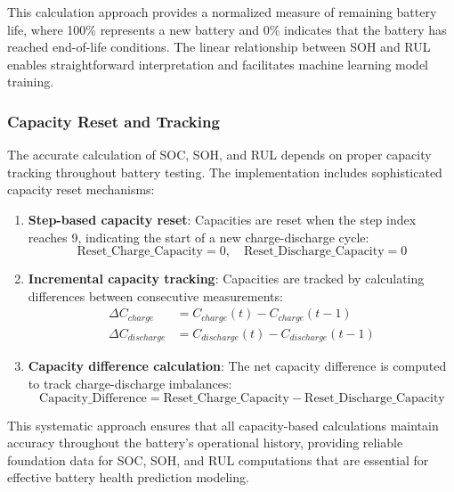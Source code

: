 This calculation approach provides a normalized measure of remaining battery life, where 100\% represents a new battery and 0\% indicates that the battery has reached end-of-life conditions. The linear relationship between SOH and RUL enables straightforward interpretation and facilitates machine learning model training.

\subsubsection{Capacity Reset and Tracking}
\label{subsubsec:capacity_tracking}

The accurate calculation of SOC, SOH, and RUL depends on proper capacity tracking throughout battery testing. The implementation includes sophisticated capacity reset mechanisms:

\begin{enumerate}
    \item \textbf{Step-based capacity reset}: Capacities are reset when the step index reaches 9, indicating the start of a new charge-discharge cycle:
    \begin{equation}
        \text{Reset\_Charge\_Capacity} = 0, \quad \text{Reset\_Discharge\_Capacity} = 0
    \end{equation}
    
    \item \textbf{Incremental capacity tracking}: Capacities are tracked by calculating differences between consecutive measurements:
    \begin{align}
        \Delta C_{charge} &= C_{charge}(t) - C_{charge}(t-1) \\
        \Delta C_{discharge} &= C_{discharge}(t) - C_{discharge}(t-1)
    \end{align}
    
    \item \textbf{Capacity difference calculation}: The net capacity difference is computed to track charge-discharge imbalances:
    \begin{equation}
        \text{Capacity\_Difference} = \text{Reset\_Charge\_Capacity} - \text{Reset\_Discharge\_Capacity}
    \end{equation}
\end{enumerate}

This systematic approach ensures that all capacity-based calculations maintain accuracy throughout the battery's operational history, providing reliable foundation data for SOC, SOH, and RUL computations that are essential for effective battery health prediction modeling.
